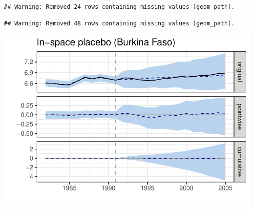 \documentclass[]{article}
\begin{document}
\begin{verbatim}
## Warning: Removed 24 rows containing missing values (geom_path).
\end{verbatim}

\begin{verbatim}
## Warning: Removed 48 rows containing missing values (geom_path).
\end{verbatim}

\includegraphics{ProjectNotebook_files/figure-latex/unnamed-chunk-16-1.pdf}
\end{document}
